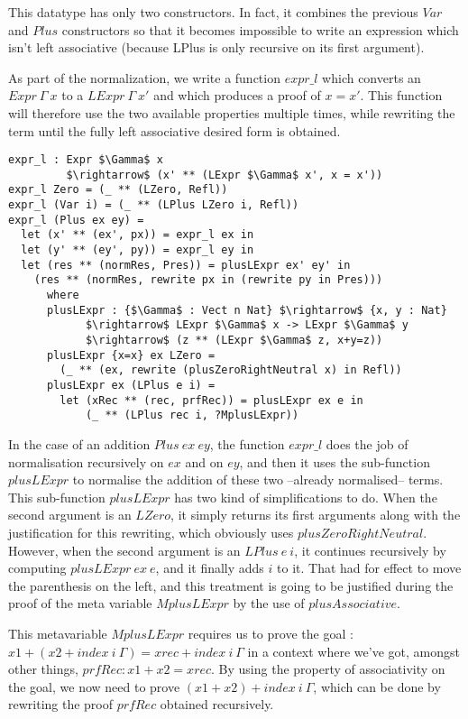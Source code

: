 This datatype has only two constructors. In fact, it combines the previous $Var$ and $Plus$ constructors so that it becomes impossible to write an expression which isn't left associative (because LPlus is only recursive on its first argument).
 
As part of the normalization, we write a function $expr\_l$ which converts an $Expr\ \Gamma\ x$ to a $LExpr\ \Gamma\ x'$ and which produces a proof of $x=x'$. This function will therefore use the two available properties multiple times, while rewriting the term until the fully left associative desired form is obtained.


\begin{lstlisting}
expr_l : Expr $\Gamma$ x 
         $\rightarrow$ (x' ** (LExpr $\Gamma$ x', x = x'))
expr_l Zero = (_ ** (LZero, Refl))
expr_l (Var i) = (_ ** (LPlus LZero i, Refl))
expr_l (Plus ex ey) = 
  let (x' ** (ex', px)) = expr_l ex in
  let (y' ** (ey', py)) = expr_l ey in
  let (res ** (normRes, Pres)) = plusLExpr ex' ey' in
    (res ** (normRes, rewrite px in (rewrite py in Pres)))
      where 
      plusLExpr : {$\Gamma$ : Vect n Nat} $\rightarrow$ {x, y : Nat} 
            $\rightarrow$ LExpr $\Gamma$ x -> LExpr $\Gamma$ y  
            $\rightarrow$ (z ** (LExpr $\Gamma$ z, x+y=z))
      plusLExpr {x=x} ex LZero =
        (_ ** (ex, rewrite (plusZeroRightNeutral x) in Refl))            
      plusLExpr ex (LPlus e i) =
        let (xRec ** (rec, prfRec)) = plusLExpr ex e in
            (_ ** (LPlus rec i, ?MplusLExpr))

\end{lstlisting}

In the case of an addition $Plus\ ex\ ey$, the function $expr\_l$ does the job of normalisation recursively on $ex$ and on $ey$, and then it uses the sub-function $plusLExpr$ to normalise the addition of these two --already normalised-- terms. This sub-function $plusLExpr$ has two kind of simplifications to do. When the second argument is an $LZero$, it simply returns its first arguments along with the justification for this rewriting, which obviously uses $plusZeroRightNeutral$. However, when the second argument is an $LPlus\ e\ i$, it continues recursively by computing $plusLExpr\ ex\ e$, and it finally adds $i$ to it. That had for effect to move the parenthesis on the left, and this treatment is going to be justified during the proof of the meta variable $MplusLExpr$ by the use of $plusAssociative$.

This metavariable $MplusLExpr$ requires us to prove the goal : $x1 + (x2 + index\ i\ \Gamma) = xrec + index\ i\ \Gamma$ in a context where we've got, amongst other things, $prfRec : x1 + x2 = xrec$.
By using the property of associativity on the goal, we now need to prove $(x1 + x2) + index\ i\ \Gamma$, which can be done by rewriting the proof $prfRec$ obtained recursively.

